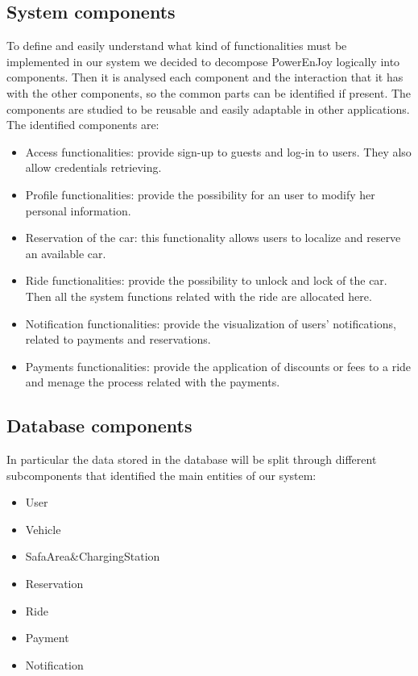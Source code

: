 \subsection{System components}
To define and easily understand what kind of functionalities must be implemented in our system we decided to decompose PowerEnJoy logically into components. Then it is analysed each component and the interaction that it has with the other components, so the common parts can be identified if present. The components are studied to be reusable and easily adaptable in other applications.
\\The identified components are:
\begin{itemize}
	\item Access functionalities: provide sign-up to guests and log-in to users. They also allow credentials retrieving.
	\item Profile functionalities: provide the possibility for an user to modify her personal information.
	\item Reservation of the car: this functionality allows users to localize and reserve an available car.
	\item Ride functionalities: provide the possibility to unlock and lock of the car. Then all the system functions related with the ride are allocated here. %
	\item Notification functionalities: provide the visualization of users' notifications, related to payments and reservations.%
	\item Payments functionalities: provide the application of discounts or fees to a ride and menage the process related with the payments.
\end{itemize}

\subsection{Database components}
In particular the data stored in the database will be split through different subcomponents that identified the main entities of our system:
\begin{itemize}
	\item User  %
	\item Vehicle 
	\item SafaArea\&ChargingStation
	\item Reservation 
	\item Ride
	\item Payment  
	\item Notification 
\end{itemize} %

